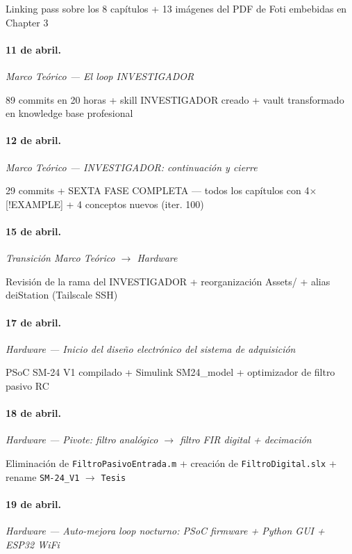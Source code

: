 Linking pass sobre los 8 capítulos + 13 imágenes del PDF de Foti embebidas en Chapter 3

\paragraph{11 de abril.}
\emph{Marco Teórico --- El loop INVESTIGADOR}

89 commits en 20 horas + skill INVESTIGADOR creado + vault transformado en knowledge base profesional

\paragraph{12 de abril.}
\emph{Marco Teórico --- INVESTIGADOR: continuación y cierre}

29 commits + SEXTA FASE COMPLETA --- todos los capítulos con 4$\times$[!EXAMPLE] + 4 conceptos nuevos (iter. 100)

\paragraph{15 de abril.}
\emph{Transición Marco Teórico $\rightarrow$ Hardware}

Revisión de la rama del INVESTIGADOR + reorganización Assets/ + alias deiStation (Tailscale SSH)

\paragraph{17 de abril.}
\emph{Hardware --- Inicio del diseño electrónico del sistema de adquisición}

PSoC SM-24 V1 compilado + Simulink SM24\_model + optimizador de filtro pasivo RC

\paragraph{18 de abril.}
\emph{Hardware --- Pivote: filtro analógico $\rightarrow$ filtro FIR digital + decimación}

Eliminación de \texttt{FiltroPasivoEntrada.m} + creación de \texttt{FiltroDigital.slx} + rename \texttt{SM-24\_V1} $\rightarrow$ \texttt{Tesis}

\paragraph{19 de abril.}
\emph{Hardware --- Auto-mejora loop nocturno: PSoC firmware + Python GUI + ESP32 WiFi}

